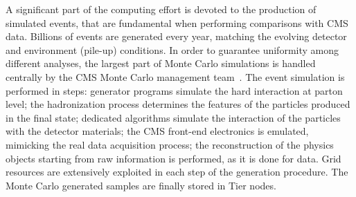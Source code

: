 \noindent A significant part of the computing effort is devoted to the production of simulated events, that are fundamental when performing comparisons with CMS data. Billions of events are generated every year, matching the evolving detector and environment (pile-up) conditions. In order to guarantee uniformity among different analyses, the largest part of Monte Carlo simulations is handled centrally by the CMS Monte Carlo management team~\cite{Boudoul:2015bkp}. The event simulation is performed in steps: generator programs simulate the hard interaction at parton level; the hadronization process determines the features of the particles produced in the final state; dedicated algorithms simulate the interaction of the particles with the detector materials; the CMS front-end electronics is emulated, mimicking the real data acquisition process; the reconstruction of the physics objects starting from raw information is performed, as it is done for data. Grid resources are extensively exploited in each step of the generation procedure. The Monte Carlo generated samples are finally stored in Tier nodes.


